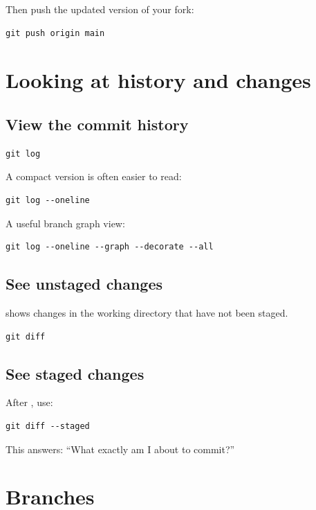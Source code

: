 \documentclass[11pt]{article}
\begin{document}
Then push the updated version of your fork:

\begin{lstlisting}[style=terminal]
git push origin main
\end{lstlisting}

\section{Looking at history and changes}

\subsection{View the commit history}

\begin{lstlisting}[style=terminal]
git log
\end{lstlisting}

A compact version is often easier to read:

\begin{lstlisting}[style=terminal]
git log --oneline
\end{lstlisting}

A useful branch graph view:

\begin{lstlisting}[style=terminal]
git log --oneline --graph --decorate --all
\end{lstlisting}

\subsection{See unstaged changes}
 shows changes in the working directory that have not been staged.

\begin{lstlisting}[style=terminal]
git diff
\end{lstlisting}

\subsection{See staged changes}
After , use:

\begin{lstlisting}[style=terminal]
git diff --staged
\end{lstlisting}

This answers: ``What exactly am I about to commit?''

\section{Branches}
\end{document}
